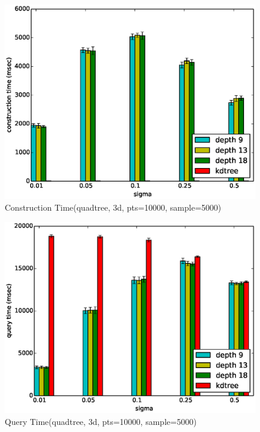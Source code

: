 \documentclass[mcs]{scsthesis}
\begin{document}
\begin{figure}
\begin{center}
\includegraphics[scale=0.5]{diagrams/qt_3d_pts10000_sample5000_ctime.eps}
\caption{Construction Time(quadtree, 3d, pts=10000, sample=5000)}
\label{fig:max_build_depth_ctime_qt}
\end{center}
\end{figure}

\begin{figure}
\begin{center}
\includegraphics[scale=0.5]{diagrams/qt_3d_pts10000_sample5000_qtime.eps}
\caption{Query Time(quadtree, 3d, pts=10000, sample=5000)}
\label{fig:max_build_depth_qtime_qt}
\end{center}
\end{figure}
\end{document}
